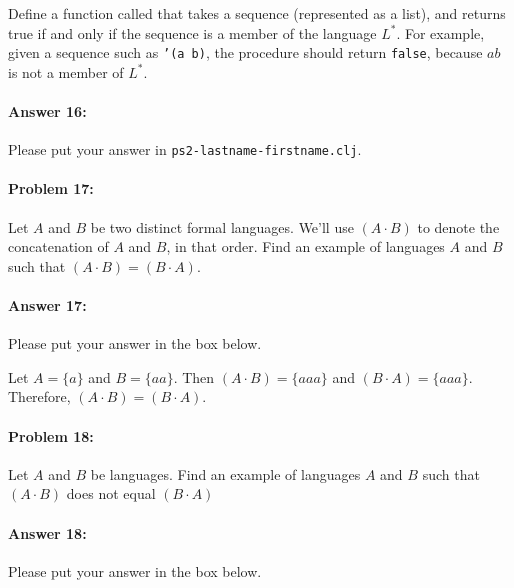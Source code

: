 \documentclass[10pt]{article}
\newenvironment{AnswerBox}{\begin{mdframed}[style=simple]}{\end{mdframed}}
\newcommand{\required}[1]{{\color{blue}{#1}}}
\newcommand{\PSnum}{2}
\begin{document}
Define a function called \required{\texttt{in-L-star?}} that takes a sequence
(represented as a list), and returns true if and only if the sequence is a
member of the language $L^*$. For example, given a sequence such as \texttt{'(a
b)}, the procedure should return \texttt{false}, because $ab$ is not a member of
$L^*$.

\paragraph{Answer 16:} Please put your answer in
\texttt{ps\PSnum-lastname-firstname.clj}.

\noindent\hrulefill %

\paragraph{Problem 17:}
Let $A$ and $B$ be two distinct formal languages. We'll use $(A\cdot B)$ to
denote the concatenation of $A$ and $B$, in that order. Find an example of
languages $A$ and $B$ such that $(A\cdot B)=(B\cdot A)$.

\paragraph{Answer 17:} Please put your answer in the box below.

\begin{AnswerBox}%

  Let $A = \{a\}$ and $B = \{aa\}$. Then $(A\cdot B) = \{aaa\}$ and $(B\cdot A) = \{aaa\}$. Therefore, $(A\cdot B) = (B\cdot A)$.

\end{AnswerBox}%

\noindent\hrulefill %

\paragraph{Problem 18:}
Let $A$ and $B$ be languages. Find an example of languages $A$ and $B$ such that
$(A\cdot B)$ does not equal $(B\cdot A)$

\paragraph{Answer 18:} Please put your answer in the box below.
\end{document}
